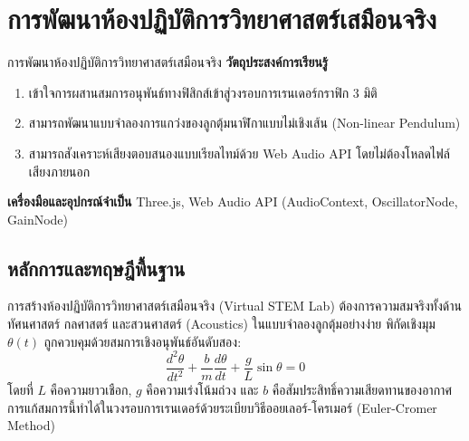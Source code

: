 
\chapter{การพัฒนาห้องปฏิบัติการวิทยาศาสตร์เสมือนจริง}
\label{ch:lab07}


\vspace{0.4cm}

\begin{labobjectivebox}{การพัฒนาห้องปฏิบัติการวิทยาศาสตร์เสมือนจริง}
\textbf{วัตถุประสงค์การเรียนรู้}
\begin{enumerate}[leftmargin=1.8cm, itemsep=2pt]
    \item เข้าใจการผสานสมการอนุพันธ์ทางฟิสิกส์เข้าสู่วงรอบการเรนเดอร์กราฟิก 3 มิติ
    \item สามารถพัฒนาแบบจำลองการแกว่งของลูกตุ้มนาฬิกาแบบไม่เชิงเส้น (Non-linear Pendulum)
    \item สามารถสังเคราะห์เสียงตอบสนองแบบเรียลไทม์ด้วย Web Audio API โดยไม่ต้องโหลดไฟล์เสียงภายนอก
\end{enumerate}

\vspace{4pt}
\textbf{เครื่องมือและอุปกรณ์จำเป็น} \enspace Three.js, Web Audio API (AudioContext, OscillatorNode, GainNode)
\end{labobjectivebox}

\section{หลักการและทฤษฎีพื้นฐาน}

การสร้างห้องปฏิบัติการวิทยาศาสตร์เสมือนจริง (Virtual STEM Lab) ต้องการความสมจริงทั้งด้านทัศนศาสตร์ กลศาสตร์ และสวนศาสตร์ (Acoustics) ในแบบจำลองลูกตุ้มอย่างง่าย พิกัดเชิงมุม $\theta(t)$ ถูกควบคุมด้วยสมการเชิงอนุพันธ์อันดับสอง:
\begin{equation}
\frac{d^2\theta}{dt^2} + \frac{b}{m}\frac{d\theta}{dt} + \frac{g}{L}\sin\theta = 0
\end{equation}
โดยที่ $L$ คือความยาวเชือก, $g$ คือความเร่งโน้มถ่วง และ $b$ คือสัมประสิทธิ์ความเสียดทานของอากาศ การแก้สมการนี้ทำได้ในวงรอบการเรนเดอร์ด้วยระเบียบวิธีออยเลอร์-โครเมอร์ (Euler-Cromer Method)

